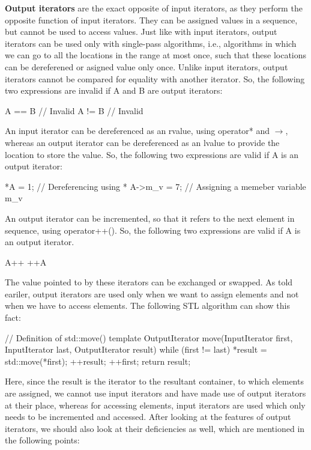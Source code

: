 \documentclass{report}
\begin{document}
\bigbreak \noindent
\textbf{Output iterators} are the exact opposite of input iterators, as they perform the opposite function of input iterators. They can be assigned values in a sequence, but cannot be used to access values.
\bigbreak \noindent
Just like with input iterators, output iterators can be used only with single-pass algorithms, i.e., algorithms in which we can go to all the locations in the range at most once, such that these locations can be dereferened or asigned value only once.
\bigbreak \noindent
Unlike input iterators, output iterators cannot be compared for equality with another iterator. So, the following two expressions are invalid if A and B are output iterators:
\begin{cppcode}
A == B  // Invalid
A != B // Invalid
\end{cppcode}
\noindent An input iterator can be dereferenced as an rvalue, using operator* and $\rightarrow$, whereas an output iterator can be dereferenced as an lvalue to provide the location to store the value. So, the following two expressions are valid if A is an output iterator:
\begin{cppcode}
 *A = 1; // Dereferencing using *
 A->m_v = 7; // Assigning a memeber variable m_v
\end{cppcode}
\noindent An output iterator can be incremented, so that it refers to the next element in sequence, using operator++(). So, the following two expressions are valid if A is an output iterator.
\begin{cppcode}
 A++ 
 ++A
\end{cppcode}
\noindent
The value pointed to by these iterators can be exchanged or swapped.
\bigbreak \noindent
As told eariler, output iterators are used only when we want to assign elements and not when we have to access elements. The following STL algorithm can show this fact:
\begin{cppcode}
// Definition of std::move() 
template
OutputIterator move(InputIterator first, InputIterator last, OutputIterator result) {
  while (first != last) {
    *result = std::move(*first);
    ++result;
    ++first;
  }
  return result;
}
\end{cppcode}
\noindent Here, since the result is the iterator to the resultant container, to which elements are assigned, we cannot use input iterators and have made use of output iterators at their place, whereas for accessing elements, input iterators are used which only needs to be incremented and accessed.
\noindent After looking at the features of output iterators, we should also look at their deficiencies as well, which are mentioned in the following points:
\end{document}
